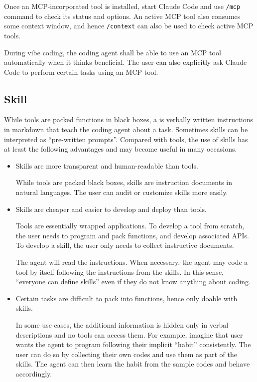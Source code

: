 Once an MCP-incorporated tool is installed, start Claude Code and use \verb|/mcp| command to check its status and options. An active MCP tool also consumes some context window, and hence \verb|/context| can also be used to check active MCP tools.

During vibe coding, the coding agent shall be able to use an MCP tool automatically when it thinks beneficial. The user can also explicitly ask Claude Code to perform certain tasks using an MCP tool.

\subsection{Skill} \label{sec:claudeskill}

While tools are packed functions in black boxes, a  is verbally written instructions in markdown that teach the coding agent about a task. Sometimes skills can be interpreted as ``pre-written prompts''. Compared with tools, the use of skills has at least the following advantages and may become useful in many occasions.

\begin{itemize}
  \item Skills are more transparent and human-readable than tools.
  
  While tools are packed black boxes, skills are instruction documents in natural languages. The user can audit or customize skills more easily.
  
  \item Skills are cheaper and easier to develop and deploy than tools.
  
  Tools are essentially wrapped applications. To develop a tool from scratch, the user needs to program and pack functions, and develop associated APIs. To develop a skill, the user only needs to collect instructive documents. 
  
  The agent will read the instructions. When necessary, the agent may code a tool by itself following the instructions from the skills. In this sense, ``everyone can define skills'' even if they do not know anything about coding.
  
  \item Certain tasks are difficult to pack into functions, hence only doable with skills. 
  
  In some use cases, the additional information is hidden only in verbal descriptions and no tools can access them. For example, imagine that user wants the agent to program following their implicit ``habit'' consistently. The user can do so by collecting their own codes and use them as part of the skills. The agent can then learn the habit from the sample codes and behave accordingly.
\end{itemize}

